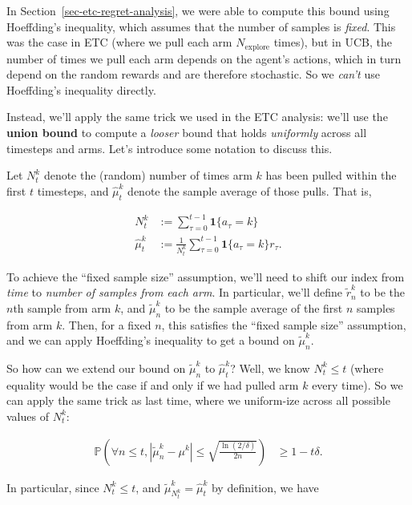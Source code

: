 \documentclass[
  letterpaper,
  DIV=11,
  numbers=noendperiod]{scrreprt}
\theoremstyle{plain}
\theoremstyle{plain}
\theoremstyle{definition}
\theoremstyle{definition}
\theoremstyle{remark}
\begin{document}
In Section~\ref{sec-etc-regret-analysis}, we were able to compute this
bound using Hoeffding's inequality, which assumes that the number of
samples is \emph{fixed}. This was the case in ETC (where we pull each
arm \(N_{\text{explore}}\) times), but in UCB, the number of times we
pull each arm depends on the agent's actions, which in turn depend on
the random rewards and are therefore stochastic. So we \emph{can't} use
Hoeffding's inequality directly.

Instead, we'll apply the same trick we used in the ETC analysis: we'll
use the \textbf{union bound} to compute a \emph{looser} bound that holds
\emph{uniformly} across all timesteps and arms. Let's introduce some
notation to discuss this.

Let \(N^k_t\) denote the (random) number of times arm \(k\) has been
pulled within the first \(t\) timesteps, and \(\hat \mu^k_t\) denote the
sample average of those pulls. That is,

\[
\begin{aligned}
    N^k_t &:= \sum_{\tau=0}^{t-1} \mathbf{1} \{ a_\tau = k \} \\
    \hat \mu^k_t &:= \frac{1}{N^k_t} \sum_{\tau=0}^{t-1} \mathbf{1} \{ a_\tau = k \} r_\tau.
\end{aligned}
\]

To achieve the ``fixed sample size'' assumption, we'll need to shift our
index from \emph{time} to \emph{number of samples from each arm}. In
particular, we'll define \(\tilde r^k_n\) to be the \(n\)th sample from
arm \(k\), and \(\tilde \mu^k_n\) to be the sample average of the first
\(n\) samples from arm \(k\). Then, for a fixed \(n\), this satisfies
the ``fixed sample size'' assumption, and we can apply Hoeffding's
inequality to get a bound on \(\tilde \mu^k_n\).

So how can we extend our bound on \(\tilde\mu^k_n\) to \(\hat \mu^k_t\)?
Well, we know \(N^k_t \le t\) (where equality would be the case if and
only if we had pulled arm \(k\) every time). So we can apply the same
trick as last time, where we uniform-ize across all possible values of
\(N^k_t\):

\[
\begin{aligned}
    \mathbb{P}\left( \forall n \le t, |\tilde \mu^k_n - \mu^k | \le \sqrt{\frac{\ln(2/\delta)}{2n}} \right) &\ge 1-t\delta.
\end{aligned}
\]

In particular, since \(N^k_t \le t\), and
\(\tilde \mu^k_{N^k_t} = \hat \mu^k_t\) by definition, we have
\end{document}
